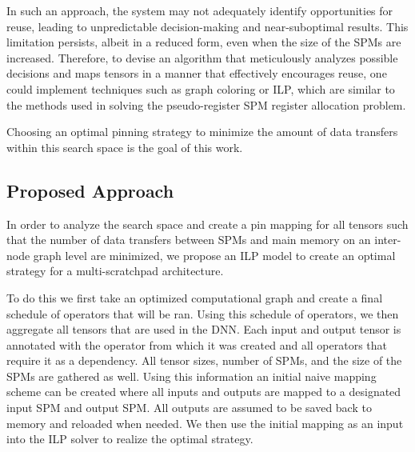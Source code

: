 In such an approach, the system may not adequately identify opportunities for
reuse, leading to unpredictable decision-making and near-suboptimal results.
This limitation persists, albeit in a reduced form, even when the size of the
SPMs are increased. Therefore, to devise an algorithm that meticulously analyzes
possible decisions and maps tensors in a manner that effectively encourages
reuse, one could implement techniques such as graph coloring or ILP, which are
similar to the methods used in solving the pseudo-register SPM register
allocation problem.

Choosing an optimal pinning strategy to minimize the amount of data transfers
within this search space is the goal of this work.

\subsection{Proposed Approach}
In order to analyze the search space and create a pin mapping for all tensors
such that the number of data transfers between SPMs and main memory on an
inter-node graph level are minimized, we propose an ILP model to create an
optimal strategy for a multi-scratchpad architecture.

To do this we first take an optimized computational graph and create a final
schedule of operators that will be ran. Using this schedule of operators, we
then aggregate all tensors that are used in the DNN. Each input and output
tensor is annotated with the operator from which it was created and all
operators that require it as a dependency. All tensor sizes, number of SPMs,
and the size of the SPMs are gathered as well. Using this information an
initial naive mapping scheme can be created where all inputs and outputs are
mapped to a designated input SPM and output SPM. All outputs are assumed to be
saved back to memory and reloaded when needed. We then use the initial mapping
as an input into the ILP solver to realize the optimal strategy.
